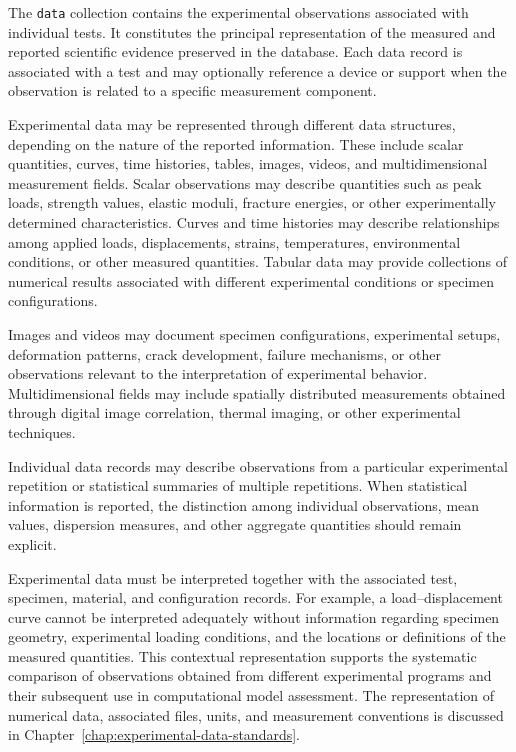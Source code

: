 The \texttt{data} collection
contains the experimental
observations associated
with individual tests.
It constitutes the principal
representation of the
measured and reported
scientific evidence
preserved in the database.
Each data record is
associated with a test
and may optionally
reference a device
or support when the
observation is related
to a specific measurement
component.

Experimental data
may be represented
through different
data structures,
depending on the
nature of the
reported information.
These include scalar
quantities, curves,
time histories,
tables, images,
videos, and
multidimensional
measurement fields.
Scalar observations
may describe quantities
such as peak loads,
strength values,
elastic moduli,
fracture energies,
or other experimentally
determined characteristics.
Curves and time histories
may describe relationships
among applied loads,
displacements, strains,
temperatures, environmental
conditions, or other
measured quantities.
Tabular data may
provide collections
of numerical results
associated with
different experimental
conditions or specimen
configurations.

Images and videos
may document specimen
configurations,
experimental setups,
deformation patterns,
crack development,
failure mechanisms,
or other observations
relevant to the
interpretation of
experimental behavior.
Multidimensional fields
may include spatially
distributed measurements
obtained through
digital image correlation,
thermal imaging,
or other experimental
techniques.

Individual data records
may describe observations
from a particular
experimental repetition
or statistical summaries
of multiple repetitions.
When statistical
information is reported,
the distinction among
individual observations,
mean values, dispersion
measures, and other
aggregate quantities
should remain explicit.

Experimental data
must be interpreted
together with the
associated test,
specimen, material,
and configuration
records.
For example, a
load--displacement
curve cannot be
interpreted adequately
without information
regarding specimen
geometry, experimental
loading conditions,
and the locations
or definitions of
the measured quantities.
This contextual
representation supports
the systematic comparison
of observations obtained
from different experimental
programs and their
subsequent use in
computational model
assessment.
The representation
of numerical data,
associated files,
units, and measurement
conventions is discussed
in Chapter~\ref{chap:experimental-data-standards}.


